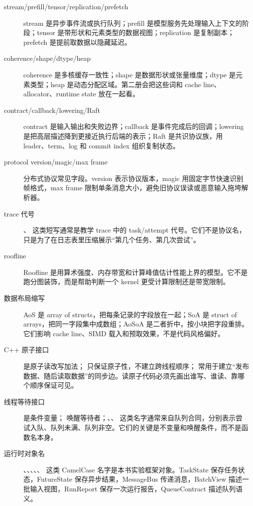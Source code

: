 \begin{description}
  \item[stream/prefill/tensor/replication/prefetch] stream 是异步事件流或执行队列；prefill 是模型服务先处理输入上下文的阶段；tensor 是带形状和元素类型的数据视图；replication 是复制副本；prefetch 是提前取数据以隐藏延迟。
  \item[coherence/shape/dtype/heap] coherence 是多核缓存一致性；shape 是数据形状或张量维度；dtype 是元素类型；heap 是动态分配区域。第二册会把这些词和 cache line、allocator、runtime state 放在一起看。
  \item[contract/callback/lowering/Raft] contract 是输入输出和失败边界；callback 是事件完成后的回调；lowering 是把高层描述降到更接近执行后端的表示；Raft 是共识协议族，用 leader、term、log 和 commit index 组织复制状态。
  \item[protocol version/magic/max frame] 分布式协议常见字段。version 表示协议版本，magic 用固定字节快速识别帧格式，max frame 限制单条消息大小，避免旧协议误读或恶意输入拖垮解析器。
  \item[trace 代号] 、 这类短写通常是教学 trace 中的 task/attempt 代号。它们不是协议名，只是为了在日志表里压缩展示“第几个任务、第几次尝试”。
  \item[roofline] Roofline 是用算术强度、内存带宽和计算峰值估计性能上界的模型。它不是跑分图装饰，而是帮助判断一个 kernel 更受计算限制还是带宽限制。
  \item[数据布局缩写] AoS 是 array of structs，把每条记录的字段放在一起；SoA 是 struct of arrays，把同一字段集中成数组；AoSoA 是二者折中，按小块把字段重排。它们影响 cache line、SIMD 载入和预取效果，不是代码风格偏好。
  \item[C++ 原子接口]  是原子读改写加法； 只保证原子性，不建立跨线程顺序； 常用于建立“发布数据、随后读取数据”的同步边。读原子代码必须先画出谁写、谁读、靠哪个顺序保证可见。
  \item[线程等待接口]  是条件变量； 唤醒等待者；、、 这类名字通常来自队列合同，分别表示尝试入队、队列未满、队列非空。它们的关键是不变量和唤醒条件，而不是函数名本身。
  \item[运行时对象名] 、、、、、 这类 CamelCase 名字是本书实验框架对象。TaskState 保存任务状态，FutureState 保存异步结果，MessageBus 传递消息，BatchView 描述一批输入视图，RunReport 保存一次运行报告，QueueContract 描述队列语义。

\end{description}
